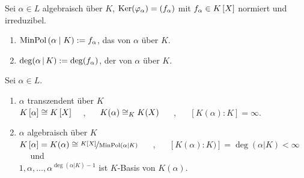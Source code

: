 \begin{definition}
    Sei $\alpha \in L$ algebraisch über $K$, $\operatorname{Ker}(\varphi_\alpha) = (f_\alpha)$ mit $f_\alpha \in \polynom[K]$ normiert und irreduzibel.
    \begin{enumerate}[nolistsep, topsep=-\baselineskip, leftmargin=*]
        \item $\operatorname{MinPol}\left( \alpha \mathrel{|} K\right) \mathrel{:=} f_\alpha$, das  von $\alpha$ über $K$.
        \item $\deg(\alpha \, | \, K) \mathrel{:=} \deg(f_\alpha)$, der  von $\alpha$ über $K$.
    \end{enumerate}
\end{definition}

\begin{satz}
    Sei $\alpha \in L$.
    \begin{enumerate}[label=(\alph*), topsep=-\baselineskip, leftmargin=*]
        \item $\alpha$ transzendent über $K$ \\
        \follows $\polynom[K][\alpha] \isomorph \polynom[K]$ $\quad$, $\quad$ $K(\alpha) \mathrel{\cong}_K K(X)$ $\quad$ , $\quad$ $[K(\alpha) \colon K] = \infty$.
        \item $\alpha$ algebraisch über $K$ \\
        \follows $\polynom[K][\alpha] = K(\alpha) \isomorph \lfrac{\polynom[K]}{\MinPol{\alpha}{K}}$ $\quad$ , $\quad$ $[ K(\alpha) \colon K)]  = \deg(\alpha | K) < \infty$ $\quad$ und \\
         $1, \alpha, \dots , \alpha^{\deg(\alpha | K) -1}$ ist $K$-Basis von $K(\alpha)$. 
     \end{enumerate}
\end{satz}
